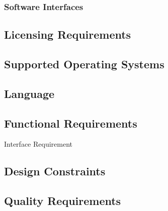 	\subsubsection{Software Interfaces}
	\label{requirements:interfaces:software}

	

\subsection{Licensing Requirements}
\label{requirements:license}

\subsection{Supported Operating Systems}
\label{requirements:os}

\subsection{Language}
\label{requirements:language}


\subsection{Functional Requirements} %
\label{requirements:functional}

\begin{requirement}{Interface Requirement}
\end{requirement}



\subsection{Design Constraints}
\label{requirements:constraints}

\subsection{Quality Requirements}
\label{requirements:quality}

